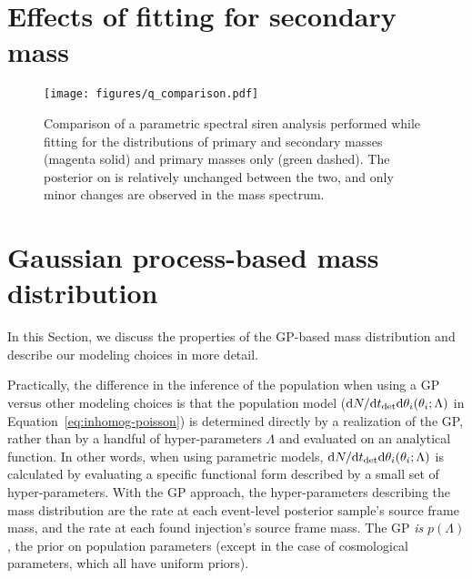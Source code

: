\documentclass[preprint2,linenumbers]{aastex631}
\begin{document}
\section{Effects of fitting for secondary mass}
\label{ap:mass ratio}
\begin{figure*}
    \texttt{[image: figures/q\_comparison.pdf]}
    \caption{Comparison of a parametric spectral siren analysis performed while fitting for the distributions of primary and secondary masses (magenta solid) and primary masses only (green dashed).
    The posterior on \Ho{} is relatively unchanged between the two, and only minor changes are observed in the mass spectrum.}
    \label{fig:mass ratio}
\end{figure*}

\section{Gaussian process-based mass distribution}
\label{ap:GP}

In this Section, we discuss the properties of the \ac{GP}-based mass distribution and describe our modeling choices in more detail. %

Practically, the difference in the inference of the population when using a \ac{GP} versus other modeling choices is that the population model ($\text{d} N/\text{d} t_{\det} \text{d} \theta_i (\theta_i;\Lambda)$ in Equation~\ref{eq:inhomog-poisson}) is determined directly by a realization of the \ac{GP}, rather than by a handful of hyper-parameters $\Lambda$ and evaluated on an analytical function.
In other words, when using parametric models, $\text{d} N/\text{d} t_{\det} \text{d} \theta_i (\theta_i;\Lambda)$ is calculated by evaluating a specific functional form described by a small set of hyper-parameters. 
With the \ac{GP} approach, the hyper-parameters describing the mass distribution are the rate at each event-level posterior sample's source frame mass, and the rate at each found injection's source frame mass.
The \ac{GP} \emph{is} $p(\Lambda)$, the prior on population parameters (except in the case of cosmological parameters, which all have uniform priors).
\end{document}
